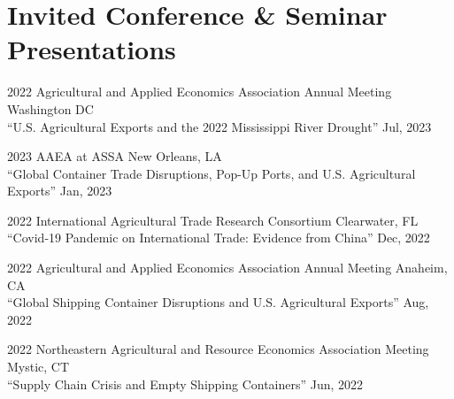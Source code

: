 \documentclass[11 pt,letterpaper]{article}
\renewenvironment{itemize}{
	\begin{list}{}{
			\setlength{\leftmargin}{1.5em}
		}
	}{
	\end{list}
}
\begin{document}
	
	
	
	
	\section*{\textbf{Invited Conference \& Seminar Presentations}}
	
	
	
	\begin{itemize}
		


		\item[-]	2022  Agricultural and Applied Economics  Association Annual Meeting   \hfill   Washington DC\vspace{0.15cm} \\
``U.S. Agricultural Exports and the 2022 Mississippi River Drought''  \hfill Jul, 2023



   \item[-]  2023 AAEA at ASSA    \hfill   New Orleans, LA\vspace{0.15cm} \\
	``Global Container Trade Disruptions, Pop-Up Ports, and U.S. Agricultural Exports''  \hfill Jan, 2023 

 

			\item[-]	2022  International Agricultural Trade Research Consortium   \hfill Clearwater, FL\vspace{0.15cm} \\
	``Covid-19 Pandemic on International Trade: Evidence from China'' \hfill   Dec, 2022
	
	
		\item[-]	2022  Agricultural and Applied Economics  Association Annual Meeting   \hfill   Anaheim, CA\vspace{0.15cm} \\
			``Global Shipping Container Disruptions and U.S. Agricultural Exports''   \hfill   Aug, 2022
			
		\item[-]  2022 Northeastern Agricultural and Resource 
			Economics Association   Meeting   \hfill   Mystic, CT\vspace{0.15cm} \\
							``Supply Chain Crisis and Empty Shipping Containers'' \hfill Jun, 
							2022  
			

\end{itemize}
\end{document}
